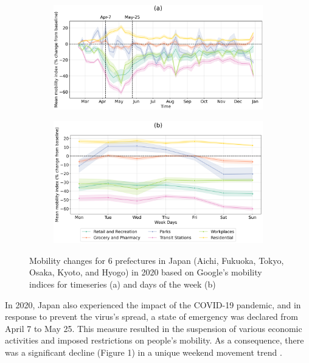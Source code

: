 \begin{figure}[tbh!]
    \centering
    \begin{subfigure}{\textwidth}
      \centering
      \includegraphics[width=\textwidth]{figs/chap4/fig1a_mobi_doy.png}
      \label{fig:chap4_fig1a}
    \end{subfigure}

    \begin{subfigure}{\textwidth}
      \centering
      \includegraphics[width=\textwidth]{figs/chap4/fig1b_mobi_dow.png}
      \label{fig:chap4_fig1b}
    \end{subfigure}
    \caption[Mobility changes for 6 prefectures in Japan]{Mobility changes for 6 prefectures in Japan (Aichi, Fukuoka, Tokyo, Osaka, Kyoto, and Hyogo) in 2020 based on Google’s mobility indices for timeseries (a) and days of the week (b)}
    \label{fig:chap4_fig1}
\end{figure}

In 2020, Japan also experienced the impact of the COVID-19 pandemic, and in response to prevent the virus's spread, a state of emergency was declared from April 7 to May 25. This measure resulted in the suspension of various economic activities and imposed restrictions on people's mobility. As a consequence, there was a significant decline (Figure 1) in a unique weekend movement trend \citep{damiani2022peculiar}. \par

